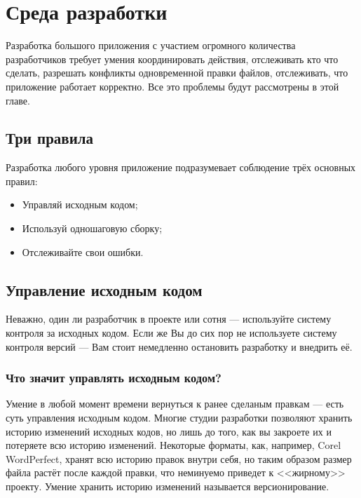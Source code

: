 \chapter{ Среда разработки } \label{chapt3}


Разработка большого приложения с участием огромного количества разработчиков требует умения координировать действия, отслеживать кто что сделать, разрешать конфликты одновременной правки файлов, отслеживать, что приложение работает корректно. Все это проблемы будут рассмотрены в этой главе.

\section{ Три правила} \label{sect3_1}

Разработка любого уровня приложение подразумевает соблюдение трёх основных правил:
\begin{itemize}
\item Управляй исходным кодом;
\item Используй одношаговую сборку;
\item Отслеживайте свои ошибки.

\end{itemize}

\section{ Управление исходным кодом} \label{sect3_2}

Неважно, один ли разработчик в проекте или сотня --- используйте систему контроля за исходных кодом. Если же Вы до сих пор не используете систему контроля версий --- Вам стоит немедленно остановить разработку и внедрить её.

\subsection{ Что значит управлять исходным кодом?} \label{sect3_2_1}

Умение в любой момент времени вернуться к ранее сделаным правкам --- есть суть управления исходным кодом. Многие студии разработки позволяют хранить историю изменений исходных кодов, но лишь до того, как вы закроете их и потеряете всю историю изменений. Некоторые форматы, как, например, Corel WordPerfect, хранят всю историю правок внутри себя, но таким образом размер файла растёт после каждой правки, что неминуемо приведет к <<жирному>> проекту. Умение хранить историю изменений называется версионирование.

